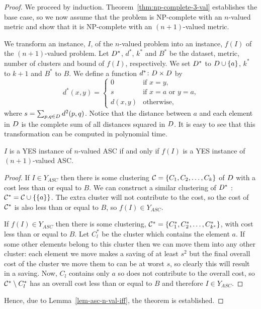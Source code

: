\begin{proof}
  We proceed by induction.  Theorem~\ref{thm:np-complete-3-val} establishes
  the base case, so we now assume that the problem is NP-complete with an
  $n$-valued metric and show that it is NP-complete with an $(n+1)$-valued
  metric.

  We transform an instance, $I$, of the $n$-valued problem into an instance,
  $f(I)$ of the $(n+1)$-valued problem.  Let $D^*$, $d^*$, $k^*$ and $B^*$
  be the dataset, metric, number of clusters and bound of $f(I)$,
  respectively.  We set $D^*$ to $D \cup \{a\}$, $k^*$ to $k+1$ and
  $B^*$ to $B$.  We define a function $d^* \colon D \times D$ by
  \begin{equation*}
    d^*(x,y) =
    \begin{cases}
      0 & \text{if $x=y$,}\\
      s & \text{if $x=a$ or $y=a$,}\\
      d(x,y) & \text{otherwise,}
    \end{cases}
  \end{equation*}
  where $s = \sum_{p,q \in D} d^2(p,q)$.  Notice that the distance between
  $a$ and each element in $D$ is the complete sum of all distances squared
  in $D$.  It is easy to see that this transformation can be computed in
  polynomial time.

  \begin{lem}
    \label{lem-asc-n-val-iff}
    $I$ is a YES instance of $n$-valued ASC if and only if $f(I)$ is a YES
    instance of $(n+1)$-valued ASC.
  \end{lem}
  \begin{proof}
    If $I \in Y_{ASC}$ then there is some clustering $\mathcal{C} =
    \{C_1,C_2,\dotsc,C_k\}$ of $D$ with a cost less than or equal to $B$.
    We can construct a similar clustering of $D^*$ : $\mathcal{C}^* = \mathcal{C} \cup
    \{\{a\}\}$.  The extra cluster will not contribute to the cost, so the
    cost of $\mathcal{C}^*$ is also less than or equal to $B$, so $f(I) \in
    Y_{ASC}$.

    If $f(I) \in Y_{ASC}$ then there is some clustering, $\mathcal{C}^* =
    \{C^*_1,C^*_2,\dotsc, C^*_{k^*}\}$, with cost less than or equal to $B$.
    Let $C^*_l$ be the cluster which contains the element $a$.  If some other
    elements belong to this cluster then we can move them into any other
    cluster: each element we move makes a saving of at least $s^2$ but the
    final overall cost of the cluster we move them to can be at worst $s$, so
    clearly this will result in a saving.  Now, $C_l$ contains only $a$ so
    does not contribute to the overall cost, so $\mathcal{C}^* \setminus C^*_l$ has
    an overall cost less than or equal to $B$ and therefore $I \in Y_{ASC}$.
  \end{proof}

  Hence, due to Lemma~\ref{lem-asc-n-val-iff}, the theorem is established.
\end{proof}


